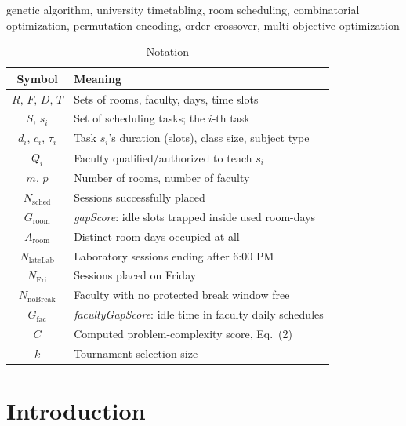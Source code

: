 \documentclass[conference]{IEEEtran}
\begin{document}
\begin{IEEEkeywords}
genetic algorithm, university timetabling, room scheduling, combinatorial optimization, permutation encoding, order crossover, multi-objective optimization
\end{IEEEkeywords}

\begin{table}[t]
\caption{Notation}
\label{tab:notation}
\centering
\small
\begin{tabular}{cl}
\toprule
Symbol & Meaning \\
\midrule
$R,\,F,\,D,\,T$ & Sets of rooms, faculty, days, time slots \\
$S,\,s_i$ & Set of scheduling tasks; the $i$-th task \\
$d_i,\,c_i,\,\tau_i$ & Task $s_i$'s duration (slots), class size, subject type \\
$Q_i$ & Faculty qualified/authorized to teach $s_i$ \\
$m,\,p$ & Number of rooms, number of faculty \\
$N_{\text{sched}}$ & Sessions successfully placed \\
$G_{\text{room}}$ & \emph{gapScore}: idle slots trapped inside used room-days \\
$A_{\text{room}}$ & Distinct room-days occupied at all \\
$N_{\text{lateLab}}$ & Laboratory sessions ending after 6:00 PM \\
$N_{\text{Fri}}$ & Sessions placed on Friday \\
$N_{\text{noBreak}}$ & Faculty with no protected break window free \\
$G_{\text{fac}}$ & \emph{facultyGapScore}: idle time in faculty daily schedules \\
$C$ & Computed problem-complexity score, Eq.~(2) \\
$k$ & Tournament selection size \\
\bottomrule
\end{tabular}
\end{table}

\section{Introduction}
\end{document}

